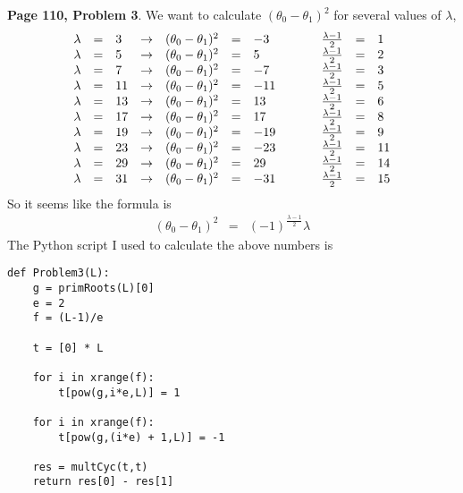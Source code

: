\documentclass[aps,preprint,preprintnumbers,nofootinbib,showpacs,prd]{revtex4-1}
\newcommand{\nbea}{\begin{eqnarray*}}
\newcommand{\neea}{\end{eqnarray*}}
\begin{document}
{\bf Page 110, Problem 3}. We want to calculate $(\theta_0 - \theta_1)^2$ for several values of $\lambda$, 
%
\nbea
\begin{array}{r c l c r c l c r c l}
\lambda & = & 3 & \to & (\theta_0 - \theta_1)^2 & = & - 3 & ~~~~~ & \frac{\lambda - 1}{2} & = & 1 \\
\lambda & = & 5 & \to & (\theta_0 - \theta_1)^2 & = & 5 & ~~~~~ & \frac{\lambda - 1}{2} & = & 2 \\
\lambda & = & 7 & \to & (\theta_0 - \theta_1)^2 & = & -7 & ~~~~~ & \frac{\lambda - 1}{2} & = & 3 \\
\lambda & = & 11 & \to & (\theta_0 - \theta_1)^2 & = & -11 & ~~~~~ & \frac{\lambda - 1}{2} & = & 5 \\
\lambda & = & 13 & \to & (\theta_0 - \theta_1)^2 & = & 13 & ~~~~~ & \frac{\lambda - 1}{2} & = & 6 \\
\lambda & = & 17 & \to & (\theta_0 - \theta_1)^2 & = & 17 & ~~~~~ & \frac{\lambda - 1}{2} & = & 8 \\
\lambda & = & 19 & \to & (\theta_0 - \theta_1)^2 & = & -19 & ~~~~~ & \frac{\lambda - 1}{2} & = & 9 \\
\lambda & = & 23 & \to & (\theta_0 - \theta_1)^2 & = & -23 & ~~~~~ & \frac{\lambda - 1}{2} & = & 11 \\
\lambda & = & 29 & \to & (\theta_0 - \theta_1)^2 & = & 29 & ~~~~~ & \frac{\lambda - 1}{2} & = & 14 \\
\lambda & = & 31 & \to & (\theta_0 - \theta_1)^2 & = & -31 & ~~~~~ & \frac{\lambda - 1}{2} & = & 15 
\end{array}
\neea
%
So it seems like the formula is
%
\nbea
(\theta_0 - \theta_1)^2 & = & (-1)^{\frac{\lambda - 1}{2}} \lambda
\neea
%
The Python script I used to calculate the above numbers is
%
\begin{Verbatim}[baselinestretch=0.75]
def Problem3(L):
    g = primRoots(L)[0]
    e = 2
    f = (L-1)/e

    t = [0] * L

    for i in xrange(f):
        t[pow(g,i*e,L)] = 1

    for i in xrange(f):
        t[pow(g,(i*e) + 1,L)] = -1

    res = multCyc(t,t)
    return res[0] - res[1]
\end{Verbatim}
%
\end{document}
